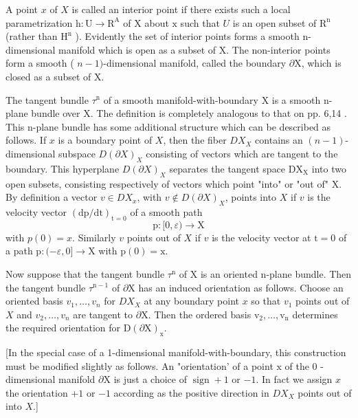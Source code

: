 \documentclass[10pt]{article}
\begin{document}
A point $x$ of $X$ is called an interior point if there exists such a local parametrization $\mathrm{h}: \mathrm{U} \rightarrow \mathrm{R}^{\mathrm{A}}$ of $\mathrm{X}$ about $\mathrm{x}$ such that $U$ is an open subset of $\mathrm{R}^{\mathrm{n}}$ (rather than $\mathrm{H}^{\mathrm{n}}$ ). Evidently the set of interior points forms a smooth $\mathrm{n}$-dimensional manifold which is open as a subset of $\mathrm{X}$. The non-interior points form a smooth ( $n-1)$-dimensional manifold, called the boundary $\partial \mathrm{X}$, which is closed as a subset of $\mathrm{X}$.

The tangent bundle $\tau^{\mathrm{n}}$ of a smooth manifold-with-boundary $\mathrm{X}$ is a smooth $\mathrm{n}$-plane bundle over $\mathrm{X}$. The definition is completely analogous to that on pp. 6,14 . This n-plane bundle has some additional structure which can be described as follows. If $x$ is a boundary point of $X$, then the fiber $D X_{X}$ contains an $(n-1)$-dimensional subspace $D(\partial X)_{X}$ consisting of vectors which are tangent to the boundary. This hyperplane $D(\partial X)_{X}$ separates the tangent space $\mathrm{DX}_{\mathrm{X}}$ into two open subsets, consisting respectively of vectors which point "into" or "out of" $\mathrm{X}$. By definition a vector $v \in D X_{x}$, with $v \notin D(\partial X)_{X}$, points into $X$ if $v$ is the velocity vector $(\mathrm{dp} / \mathrm{dt})_{\mathrm{t}=0}$ of a smooth path
$$
\mathrm{p}:[0, \varepsilon) \rightarrow \mathrm{X}
$$
with $p(0)=x$. Similarly $v$ points out of $X$ if $v$ is the velocity vector at $\mathrm{t}=0$ of a path $\mathrm{p}:(-\varepsilon, 0] \rightarrow \mathrm{X}$ with $\mathrm{p}(0)=\mathrm{x}$.

Now suppose that the tangent bundle $\tau^{\mathrm{n}}$ of $\mathrm{X}$ is an oriented $\mathrm{n}$-plane bundle. Then the tangent bundle $\tau^{\mathrm{n}-1}$ of $\partial \mathrm{X}$ has an induced orientation as follows. Choose an oriented basis $v_{1}, \ldots, v_{n}$ for $D X_{X}$ at any boundary point $x$ so that $v_{1}$ points out of $X$ and $v_{2}, \ldots, v_{n}$ are tangent to $\partial \mathrm{X}$. Then the ordered basis $\mathrm{v}_{2}, \ldots, \mathrm{v}_{\mathrm{n}}$ determines the required orientation for $\mathrm{D}(\partial \mathrm{X})_{\mathrm{x}}$.

[In the special case of a 1-dimensional manifold-with-boundary, this construction must be modified slightly as follows. An "orientation' of a point $\mathrm{x}$ of the 0 -dimensional manifold $\partial \mathrm{X}$ is just a choice of $\operatorname{sign}+1$ or $-1$. In fact we assign $x$ the orientation $+1$ or $-1$ according as the positive direction in $D X_{X}$ points out of into $X$.]
\end{document}
